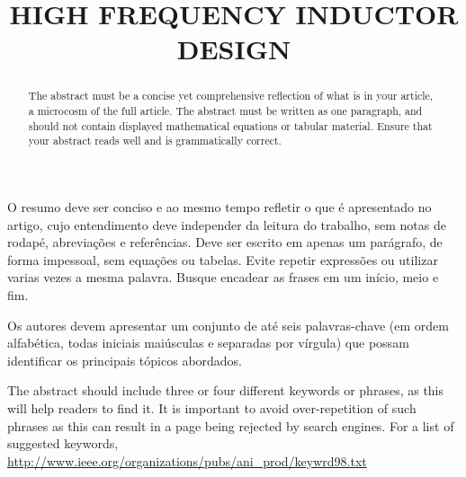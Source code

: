 
\title{HIGH FREQUENCY INDUCTOR DESIGN} %

\maketitle




\begin{resumo}  O resumo deve ser conciso e ao mesmo tempo refletir o que é apresentado no artigo, cujo entendimento deve independer da leitura do trabalho, sem notas de rodapé, abreviações e referências. Deve ser escrito em apenas um parágrafo, de forma impessoal, sem equações ou tabelas. Evite repetir expressões ou utilizar varias vezes a mesma palavra. Busque encadear as frases em um início, meio e fim.
\end{resumo}

\begin{palavraschave }
		Os autores devem apresentar um conjunto de até seis palavras-chave (em ordem alfabética, todas iniciais maiúsculas e separadas por vírgula) que possam identificar os principais tópicos abordados.	
\end{palavraschave }

\englishtitle

\begin{abstract}
	The abstract must be a concise yet comprehensive reflection of what is in your article, a microcosm of the full article. The abstract must be written as one paragraph, and should not contain displayed mathematical equations or tabular material.  Ensure that your abstract reads well and is grammatically correct.
\end{abstract}

\begin{keywords}
	The abstract should include three or four different keywords or phrases, as this will help readers to find it. It is important to avoid over-repetition of such phrases as this can result in a page being rejected by search engines. For a list of suggested keywords, \url{http://www.ieee.org/organizations/pubs/ani_prod/keywrd98.txt}
\end{keywords}


